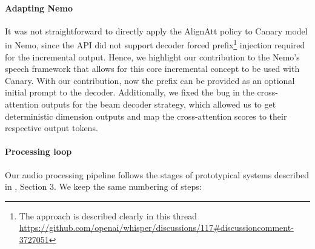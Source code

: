 \documentclass[11pt]{article}
\begin{document}
\paragraph{Adapting Nemo} It was not straightforward to directly apply the AlignAtt policy to Canary model in Nemo, since the API did not support decoder forced prefix\footnote{The approach is described clearly in this thread \url{https://github.com/openai/whisper/discussions/117\#discussioncomment-3727051}} injection required for the incremental output. Hence, we highlight our contribution to the Nemo's speech framework \citep{Harper_NeMo_a_toolkit} that allows for this core incremental concept to be used with Canary. With our contribution, now the prefix can be provided as an optional initial prompt to the decoder. Additionally, we fixed the bug in the cross-attention outputs for the beam decoder strategy, which allowed us to get deterministic dimension outputs and map the cross-attention scores to their respective output tokens.

\paragraph{Processing loop} Our audio processing pipeline follows the stages of prototypical systems described in \citet{papi-etal-2025-real}, Section 3. We keep the same numbering of steps:
\end{document}
